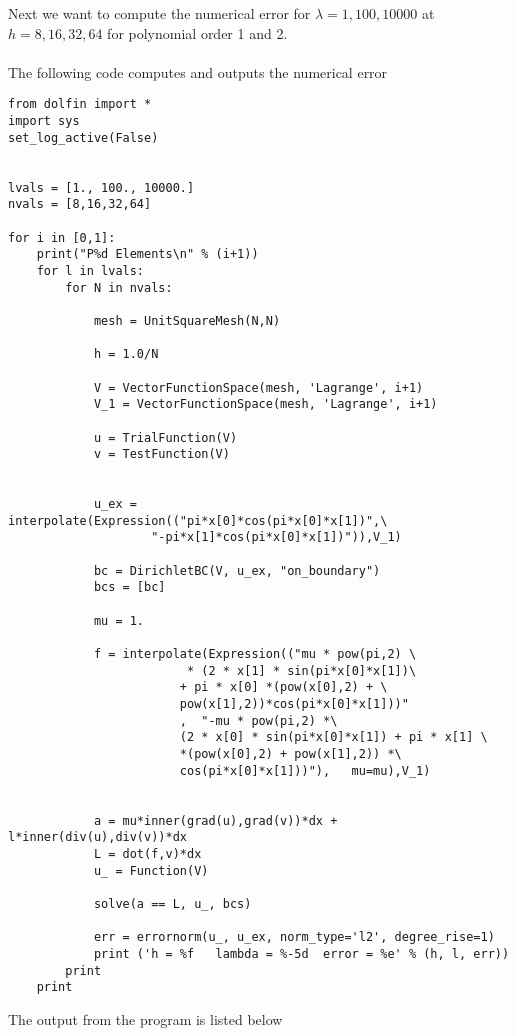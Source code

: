 \documentclass[a4paper,english,12pt,twoside]{article}
\begin{document}
Next we want to compute the numerical error for $\lambda = 1, 100, 10000$ at $h = 8, 16, 32, 64$ for polynomial order 1 and 2.\\
\\
The following code computes and outputs the numerical error
\begin{lstlisting}[style=python, basicstyle = \tiny]
from dolfin import *
import sys
set_log_active(False)


lvals = [1., 100., 10000.]
nvals = [8,16,32,64]

for i in [0,1]:
	print("P%d Elements\n" % (i+1))
	for l in lvals:
		for N in nvals:

			mesh = UnitSquareMesh(N,N)

			h = 1.0/N

			V = VectorFunctionSpace(mesh, 'Lagrange', i+1)
			V_1 = VectorFunctionSpace(mesh, 'Lagrange', i+1)

			u = TrialFunction(V)
			v = TestFunction(V)


			u_ex = interpolate(Expression(("pi*x[0]*cos(pi*x[0]*x[1])",\
					"-pi*x[1]*cos(pi*x[0]*x[1])")),V_1)
			
			bc = DirichletBC(V, u_ex, "on_boundary")
			bcs = [bc]

			mu = 1.

			f = interpolate(Expression(("mu * pow(pi,2) \
						 * (2 * x[1] * sin(pi*x[0]*x[1])\
						+ pi * x[0] *(pow(x[0],2) + \
						pow(x[1],2))*cos(pi*x[0]*x[1]))"
						,  "-mu * pow(pi,2) *\
						(2 * x[0] * sin(pi*x[0]*x[1]) + pi * x[1] \
						*(pow(x[0],2) + pow(x[1],2)) *\
						cos(pi*x[0]*x[1]))"),	mu=mu),V_1)
			

			a = mu*inner(grad(u),grad(v))*dx + l*inner(div(u),div(v))*dx
			L =	dot(f,v)*dx
			u_ = Function(V)

			solve(a == L, u_, bcs)	
			
			err = errornorm(u_, u_ex, norm_type='l2', degree_rise=1)
			print ('h = %f   lambda = %-5d  error = %e' % (h, l, err))
		print
	print
\end{lstlisting}
\newpage
The output from the program is listed below
\end{document}
